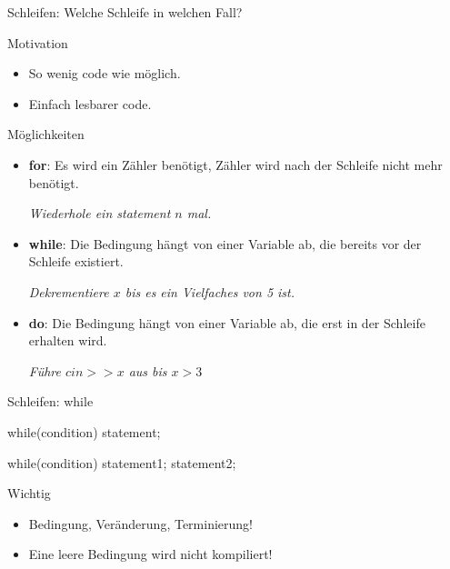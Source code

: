 \ifnum\conditionmacro=1 \documentclass[handout,usenames,dvipsnames]{beamer}\fi
\begin{document}

\begin{frame}{Schleifen: Welche Schleife in welchen Fall?}
\begin{block}{Motivation}
\begin{itemize}
\item So wenig code wie möglich.
\item Einfach lesbarer code.
\end{itemize}
\end{block}
\begin{block}{Möglichkeiten}
\begin{itemize}
\item \textbf{for}: Es wird ein Zähler benötigt, Zähler wird nach der Schleife nicht mehr benötigt.

\emph{Wiederhole ein statement $n$ mal.}
\item \textbf{while}: Die Bedingung hängt von einer Variable ab, die bereits vor der Schleife existiert.

\emph{Dekrementiere $x$ bis es ein Vielfaches von 5 ist.}
\item \textbf{do}: Die Bedingung hängt von einer Variable ab, die erst in der Schleife erhalten wird.

\emph{Führe $cin>>x$ aus bis $x>3$}
\end{itemize}
\end{block}
\end{frame}

\begin{frame}[fragile]{Schleifen: while}
\begin{TPCpp}
while(condition)
	statement;
	
while(condition){
	statement1;
	statement2;
}
\end{TPCpp}

\begin{block}{Wichtig}
\begin{itemize}
\item Bedingung, Veränderung, Terminierung!
\item Eine leere Bedingung wird nicht kompiliert!
\end{itemize}
\end{block}
\end{frame}
\end{document}
